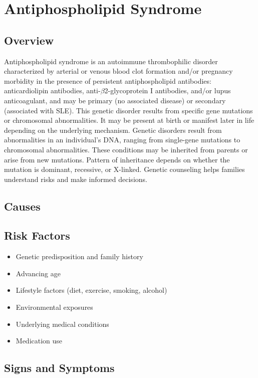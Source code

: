 \chapter{Antiphospholipid Syndrome}
\label{sec:Antiphospholipid Syndrome}

\section{Overview}
Antiphospholipid syndrome is an autoimmune thrombophilic disorder characterized by arterial or venous blood clot formation and/or pregnancy morbidity in the presence of persistent antiphospholipid antibodies: anticardiolipin antibodies, anti-$\beta$2-glycoprotein I antibodies, and/or lupus anticoagulant, and may be primary (no associated disease) or secondary (associated with SLE). This genetic disorder results from specific gene mutations or chromosomal abnormalities. It may be present at birth or manifest later in life depending on the underlying mechanism. Genetic disorders result from abnormalities in an individual's DNA, ranging from single-gene mutations to chromosomal abnormalities. These conditions may be inherited from parents or arise from new mutations. Pattern of inheritance depends on whether the mutation is dominant, recessive, or X-linked. Genetic counseling helps families understand risks and make informed decisions.
\section{Causes}
\section{Risk Factors}

\begin{itemize}[noitemsep]
  \item Genetic predisposition and family history
  \item Advancing age
  \item Lifestyle factors (diet, exercise, smoking, alcohol)
  \item Environmental exposures
  \item Underlying medical conditions
  \item Medication use
\end{itemize}
\section{Signs and Symptoms}

